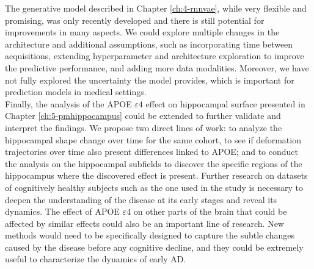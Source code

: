 The generative model described in Chapter \ref{ch:4-rnnvae}, while very flexible and promising, was only recently developed and there is still potential for improvements in many aspects. We could explore multiple changes in the architecture and additional assumptions, such as incorporating time between acquisitions, extending hyperparameter and architecture exploration to improve the predictive performance, and adding more data modalities. Moreover, we have not fully explored the uncertainty the model provides, which is important for prediction models in medical settings. \\

Finally, the analysis of the APOE $\varepsilon4$ effect on hippocampal surface presented in Chapter \ref{ch:5-pmhippocampus} could be extended to further validate and interpret the findings. We propose two direct lines of work: to analyze the hippocampal shape change over time for the same cohort, to see if deformation trajectories over time also present differences linked to APOE; and to conduct the analysis on the hippocampal subfields to discover the specific regions of the hippocampus where the discovered effect is present. Further research on datasets of cognitively healthy subjects such as the one used in the study is necessary to deepen the understanding of the disease at its early stages and reveal its dynamics. The effect of APOE $\varepsilon4$ on other parts of the brain that could be affected by similar effects could also be an important line of research. New methods would need to be specifically designed to capture the subtle changes caused by the disease before any cognitive decline, and they could be extremely useful to characterize the dynamics of early AD.